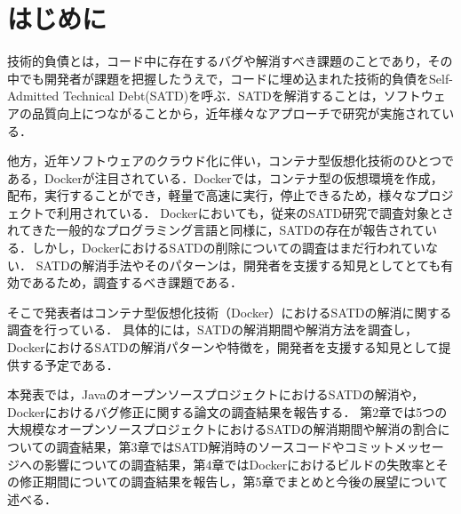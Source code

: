 \section{はじめに}
技術的負債とは，コード中に存在するバグや解消すべき課題のことであり，その中でも開発者が課題を把握したうえで，コードに埋め込まれた技術的負債をSelf-Admitted Technical Debt(SATD)を呼ぶ．SATDを解消することは，ソフトウェアの品質向上につながることから，近年様々なアプローチで研究が実施されている．

\par

他方，近年ソフトウェアのクラウド化に伴い，コンテナ型仮想化技術のひとつである，Dockerが注目されている．Dockerでは，コンテナ型の仮想環境を作成，配布，実行することができ，軽量で高速に実行，停止できるため，様々なプロジェクトで利用されている．
Dockerにおいても，従来のSATD研究で調査対象とされてきた一般的なプログラミング言語と同様に，SATDの存在が報告されている\cite{docker-satd}．しかし，DockerにおけるSATDの削除についての調査はまだ行われていない．
SATDの解消手法やそのパターンは，開発者を支援する知見としてとても有効であるため，調査するべき課題である．

\par

そこで発表者はコンテナ型仮想化技術（Docker）におけるSATDの解消に関する調査を行っている．
具体的には，SATDの解消期間や解消方法を調査し，DockerにおけるSATDの解消パターンや特徴を，開発者を支援する知見として提供する予定である．

\par

本発表では，JavaのオープンソースプロジェクトにおけるSATDの解消や，Dockerにおけるバグ修正に関する論文の調査結果を報告する．
第2章では5つの大規模なオープンソースプロジェクトにおけるSATDの解消期間や解消の割合についての調査結果，第3章ではSATD解消時のソースコードやコミットメッセージへの影響についての調査結果，第4章ではDockerにおけるビルドの失敗率とその修正期間についての調査結果を報告し，第5章でまとめと今後の展望について述べる．
